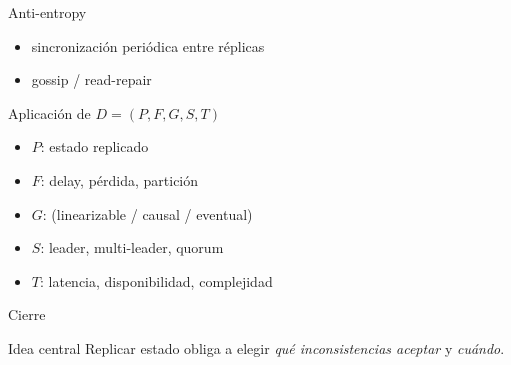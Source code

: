 \documentclass[institutional,screen,none]{ua-engineering-v6-beamer}
\begin{document}
\begin{frame}{Anti-entropy}
\begin{itemize}
\item sincronización periódica entre réplicas
\item gossip / read-repair
\end{itemize}
\end{frame}


\begin{frame}{Aplicación de $D=(P,F,G,S,T)$}
\begin{itemize}
\item $P$: estado replicado
\item $F$: delay, pérdida, partición
\item $G$: (linearizable / causal / eventual)
\item $S$: leader, multi-leader, quorum
\item $T$: latencia, disponibilidad, complejidad
\end{itemize}
\end{frame}

\begin{frame}{Cierre}
\begin{block}{Idea central}
Replicar estado obliga a elegir \emph{qué inconsistencias aceptar} y \emph{cuándo}.
\end{block}
\end{frame}
\end{document}
